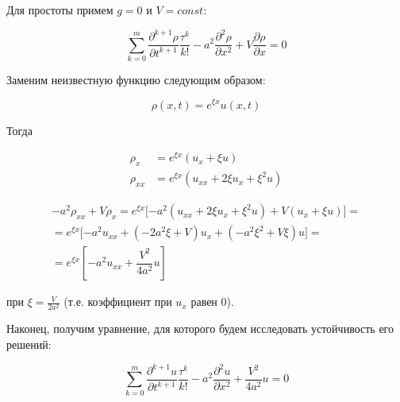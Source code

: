 Для простоты примем $g=0$ и $V=const$:

\begin{equation}
\sum\limits_{k=0}^{m} \dfrac{\partial^{k+1} \rho}{\partial t^{k+1}} \dfrac{\tau^k}{k!} - a^2 \dfrac{\partial^2 \rho}{\partial x^2} + V \dfrac{\partial \rho}{\partial x} = 0
\end{equation}

Заменим неизвестную функцию следующим образом:

\begin{equation*}
\rho (x,t) = e^{\xi x} u(x,t)
\end{equation*}

Тогда

\begin{align*}
\rho_x & = e^{\xi x} (u_x + \xi u)\\
\rho_{xx} & = e^{\xi x} (u_{xx} + 2 \xi u_x + \xi^2 u)
\end{align*}

\begin{align*}
- a^2 \rho_{xx} + V \rho_x = e^{\xi x} \lbrack -a^2 (u_{xx} + 2 \xi u_x + \xi^2 u) + V (u_x + \xi u) \rbrack = \\
= e^{\xi x} \lbrack -a^2 u_{xx} + (-2 a^2 \xi + V) u_x + (-a^2 \xi^2 + V \xi) u \rbrack = \\
= e^{\xi x} \left\lbrack -a^2 u_{xx} + \dfrac{V^2}{4a^2} u \right\rbrack
\end{align*}

при $\xi = \frac{V}{2a^2}$ (т.е. коэффициент при $u_x$ равен $0$).

Наконец, получим уравнение, для которого будем исследовать устойчивость его решений:

\begin{equation}\label{eq:final}
\sum\limits_{k=0}^{m} \dfrac{\partial^{k+1} u}{\partial t^{k+1}} \dfrac{\tau^k}{k!} - a^2 \dfrac{\partial^2 u}{\partial x^2} + \dfrac{V^2}{4a^2} u = 0
\end{equation}